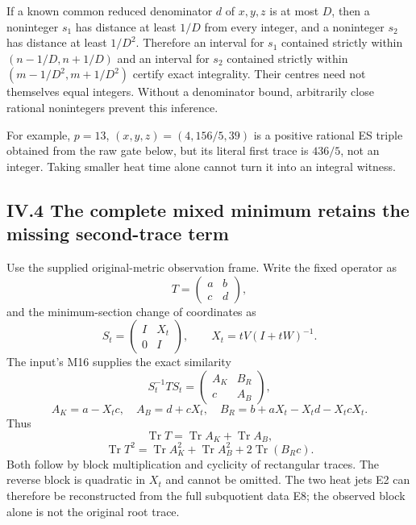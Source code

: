 If a known common reduced denominator \(d\) of \(x,y,z\) is at most \(D\), then a noninteger \(s_1\) has distance at least \(1/D\) from every integer, and a noninteger \(s_2\) has distance at least \(1/D^2\). Therefore an interval for \(s_1\) contained strictly within \((n-1/D,n+1/D)\) and an interval for \(s_2\) contained strictly within \((m-1/D^2,m+1/D^2)\) certify exact integrality. Their centres need not themselves equal integers. Without a denominator bound, arbitrarily close rational nonintegers prevent this inference.

For example, \(p=13\), \((x,y,z)=(4,156/5,39)\) is a positive rational ES triple obtained from the raw gate below, but its literal first trace is \(436/5\), not an integer. Taking smaller heat time alone cannot turn it into an integral witness.

\subsection{IV.4 The complete mixed minimum retains the missing second-trace term}\label{iv.4-the-complete-mixed-minimum-retains-the-missing-second-trace-term}

Use the supplied original-metric observation frame. Write the fixed operator as \[
 T=\begin{pmatrix}a&b\\c&d\end{pmatrix},
\] and the minimum-section change of coordinates as \[
 S_t=\begin{pmatrix}I&X_t\\0&I\end{pmatrix},\qquad
 X_t=tV(I+tW)^{-1}.
\] The input's M16 supplies the exact similarity \[
 S_t^{-1}TS_t=
 \begin{pmatrix}
 A_K&B_R\\c&A_B
 \end{pmatrix},
\] \[
 A_K=a-X_tc,\quad A_B=d+cX_t,
 \quad B_R=b+aX_t-X_td-X_tcX_t.
 \tag{E7}
\] Thus \[
 \boxed{\operatorname{Tr}T=\operatorname{Tr}A_K+\operatorname{Tr}A_B,}
\] \[
 \boxed{\operatorname{Tr}T^2
 =\operatorname{Tr}A_K^2+\operatorname{Tr}A_B^2
       +2\operatorname{Tr}(B_Rc).}
 \tag{E8}
\] Both follow by block multiplication and cyclicity of rectangular traces. The reverse block is quadratic in \(X_t\) and cannot be omitted. The two heat jets E2 can therefore be reconstructed from the full subquotient data E8; the observed block alone is not the original root trace.

